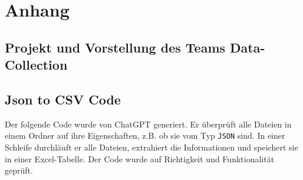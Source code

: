 \chapter{Anhang}
\label{sec:a-kapitel}
\section{Projekt und Vorstellung des Teams \glqq Data-Collection\grqq{} }



\section{Json to CSV Code}
Der folgende Code wurde von ChatGPT generiert. Er überprüft alle Dateien in einem Ordner auf ihre Eigenschaften, z.B. ob sie vom Typ \texttt{JSON} sind. In einer Schleife durchläuft er alle Dateien, extrahiert die Informationen und speichert sie in einer Excel-Tabelle. Der Code wurde auf Richtigkeit und Funktionalität geprüft.

